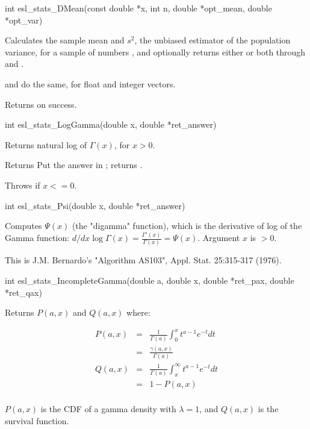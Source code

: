 \begin{sreapi}
\hypertarget{func:esl_stats_DMean()}
{\item[int esl\_stats\_DMean(const double *x, int n, double *opt\_mean, double *opt\_var)]}

Calculates the sample mean and $s^2$, the unbiased
estimator of the population variance, for a
sample of  numbers , and optionally
returns either or both through  and
.

 and  do the same,
for float and integer vectors.

Returns  on success.


\hypertarget{func:esl_stats_LogGamma()}
{\item[int esl\_stats\_LogGamma(double x, double *ret\_answer)]}

Returns natural log of $\Gamma(x)$, for $x > 0$.

Returns Put the answer in ; returns .

Throws  if $x <= 0$.


\hypertarget{func:esl_stats_Psi()}
{\item[int esl\_stats\_Psi(double x, double *ret\_answer)]}

Computes $\Psi(x)$ (the "digamma" function), which is
the derivative of log of the Gamma function:
$d/dx \log \Gamma(x) = \frac{\Gamma'(x)}{\Gamma(x)} = \Psi(x)$.
Argument $x$ is $> 0$. 

This is J.M. Bernardo's "Algorithm AS103",
Appl. Stat. 25:315-317 (1976).  


\hypertarget{func:esl_stats_IncompleteGamma()}
{\item[int esl\_stats\_IncompleteGamma(double a, double x, double *ret\_pax, double *ret\_qax)]}

Returns $P(a,x)$ and $Q(a,x)$ where:

\begin{eqnarray*}
P(a,x) & = & \frac{1}{\Gamma(a)} \int_{0}^{x} t^{a-1} e^{-t} dt \\
& = & \frac{\gamma(a,x)}{\Gamma(a)} \\
Q(a,x) & = & \frac{1}{\Gamma(a)} \int_{x}^{\infty} t^{a-1} e^{-t} dt\\
& = & 1 - P(a,x) \\
\end{eqnarray*}

$P(a,x)$ is the CDF of a gamma density with $\lambda = 1$,
and $Q(a,x)$ is the survival function.


\end{sreapi}
